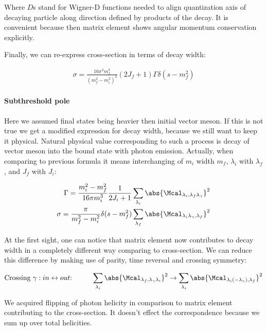 Where $D$s stand for Wigner-D functions needed to align quantization axis of decaying particle along direction defined by products of the decay. It is convenient because then matrix element shows angular momentum conservation explicitly.

Finally, we can re-express cross-section in terms of decay width:

\begin{align} \label{eq:app:crsc-dw}
    \sigma = \frac{16 \pi^2 m_f^3}{(m_f^2 - m_i^2)^2} (2J_f + 1) \Gamma \delta(s - m_f^2)
\end{align}

\paragraph{Subthreshold pole} Here we assumed final states being heavier then initial vector meson. If this is not true we get a modified expression for decay width, because we still want to keep it physical. Natural physical value corresponding to such a process is decay of vector meson into the bound state with photon emission. Actually, when comparing to previous formula it means interchanging of $m_i$ width $m_f$, $\lambda_i$ with $\lambda_f$, and $J_f$ with $J_i$:

\begin{align}
        \Gamma = \frac{m_i^2 - m_f^2}{16 \pi m_i^3} \frac{1}{2J_i + 1} \sum_{\lambda_i} \abs{\Mcal_{\lambda_i, \lambda_f \lambda_\gamma}}^2 \\
        \sigma = \frac{\pi}{m_f^2 - m_i^2} \delta(s - m_f^2) \sum_{\lambda_f} \abs{\Mcal_{\lambda_i \lambda_\gamma, \lambda_f}}^2
\end{align}

At the first sight, one can notice that matrix element now contributes to decay width in a completely different way comparing to cross-section. We can reduce this difference by making use of parity, time reversal and crossing symmetry:

\begin{align}
    &\text{Crossing $\gamma: in \leftrightarrow out$:}\qquad &\sum_{\lambda_i} \abs{\Mcal_{\lambda_f, \lambda_\gamma \lambda_i}}^2 \rightarrow \sum_{\lambda_i} \abs{\Mcal_{\lambda_i (-\lambda_\gamma), \lambda_f}}^2 \\
\end{align}

We acquired flipping of photon helicity in comparison to matrix element contributing to the cross-section. It doesn't effect the correspondence because we sum up over total helicities.

